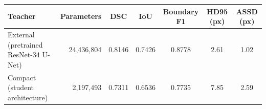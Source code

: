 \begin{tabular}{@{}lrccccc@{}}
\toprule
Teacher & Parameters & DSC & IoU & Boundary F1 & HD95 (px) & ASSD (px) \\
\midrule
External (pretrained ResNet-34 U-Net) & 24,436,804 & 0.8146 & 0.7426 & 0.8778 & 2.61 & 1.02 \\
Compact (student architecture) & 2,197,493 & 0.7311 & 0.6536 & 0.7735 & 7.85 & 2.59 \\
\bottomrule
\end{tabular}
